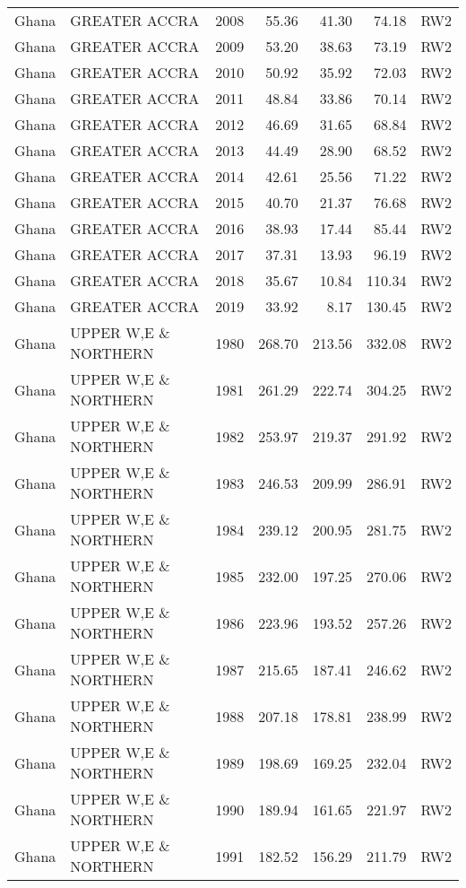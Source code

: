 \begin{longtable}{lllrrrl}
  Ghana & GREATER ACCRA & 2008 & 55.36 & 41.30 & 74.18 & RW2 \\ 
  Ghana & GREATER ACCRA & 2009 & 53.20 & 38.63 & 73.19 & RW2 \\ 
  Ghana & GREATER ACCRA & 2010 & 50.92 & 35.92 & 72.03 & RW2 \\ 
  Ghana & GREATER ACCRA & 2011 & 48.84 & 33.86 & 70.14 & RW2 \\ 
  Ghana & GREATER ACCRA & 2012 & 46.69 & 31.65 & 68.84 & RW2 \\ 
  Ghana & GREATER ACCRA & 2013 & 44.49 & 28.90 & 68.52 & RW2 \\ 
  Ghana & GREATER ACCRA & 2014 & 42.61 & 25.56 & 71.22 & RW2 \\ 
  Ghana & GREATER ACCRA & 2015 & 40.70 & 21.37 & 76.68 & RW2 \\ 
  Ghana & GREATER ACCRA & 2016 & 38.93 & 17.44 & 85.44 & RW2 \\ 
  Ghana & GREATER ACCRA & 2017 & 37.31 & 13.93 & 96.19 & RW2 \\ 
  Ghana & GREATER ACCRA & 2018 & 35.67 & 10.84 & 110.34 & RW2 \\ 
  Ghana & GREATER ACCRA & 2019 & 33.92 & 8.17 & 130.45 & RW2 \\ 
  Ghana & UPPER W,E \& NORTHERN & 1980 & 268.70 & 213.56 & 332.08 & RW2 \\ 
  Ghana & UPPER W,E \& NORTHERN & 1981 & 261.29 & 222.74 & 304.25 & RW2 \\ 
  Ghana & UPPER W,E \& NORTHERN & 1982 & 253.97 & 219.37 & 291.92 & RW2 \\ 
  Ghana & UPPER W,E \& NORTHERN & 1983 & 246.53 & 209.99 & 286.91 & RW2 \\ 
  Ghana & UPPER W,E \& NORTHERN & 1984 & 239.12 & 200.95 & 281.75 & RW2 \\ 
  Ghana & UPPER W,E \& NORTHERN & 1985 & 232.00 & 197.25 & 270.06 & RW2 \\ 
  Ghana & UPPER W,E \& NORTHERN & 1986 & 223.96 & 193.52 & 257.26 & RW2 \\ 
  Ghana & UPPER W,E \& NORTHERN & 1987 & 215.65 & 187.41 & 246.62 & RW2 \\ 
  Ghana & UPPER W,E \& NORTHERN & 1988 & 207.18 & 178.81 & 238.99 & RW2 \\ 
  Ghana & UPPER W,E \& NORTHERN & 1989 & 198.69 & 169.25 & 232.04 & RW2 \\ 
  Ghana & UPPER W,E \& NORTHERN & 1990 & 189.94 & 161.65 & 221.97 & RW2 \\ 
  Ghana & UPPER W,E \& NORTHERN & 1991 & 182.52 & 156.29 & 211.79 & RW2 \\ 

\end{longtable}
